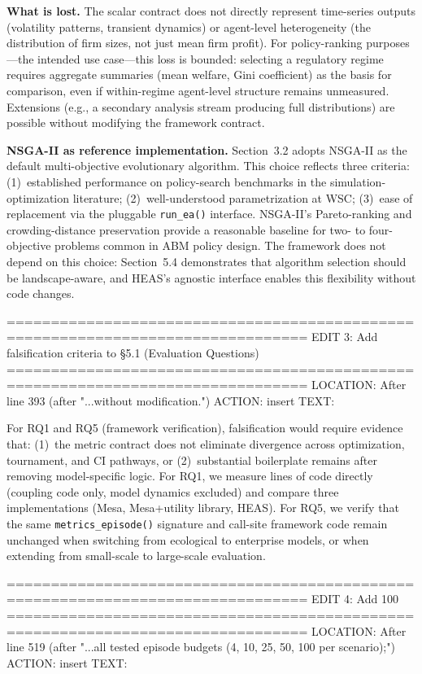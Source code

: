 \textbf{What is lost.} The scalar contract does not directly represent
time-series outputs (volatility patterns, transient dynamics) or agent-level
heterogeneity (the distribution of firm sizes, not just mean firm profit). For
policy-ranking purposes---the intended use case---this loss is bounded: selecting
a regulatory regime requires aggregate summaries (mean welfare, Gini coefficient)
as the basis for comparison, even if within-regime agent-level structure remains
unmeasured. Extensions (e.g., a secondary analysis stream producing full
distributions) are possible without modifying the framework contract.

\textbf{NSGA-II as reference implementation.} Section~3.2 adopts NSGA-II as the
default multi-objective evolutionary algorithm. This choice reflects three
criteria: (1)~established performance on policy-search benchmarks in the
simulation-optimization literature; (2)~well-understood parametrization at WSC;
(3)~ease of replacement via the pluggable \texttt{run\_ea()} interface. NSGA-II's
Pareto-ranking and crowding-distance preservation provide a reasonable baseline
for two- to four-objective problems common in ABM policy design. The framework
does not depend on this choice: Section~5.4 demonstrates that algorithm
selection should be landscape-aware, and HEAS's agnostic interface enables this
flexibility without code changes.

================================================================================
EDIT 3: Add falsification criteria to §5.1 (Evaluation Questions)
================================================================================
LOCATION: After line 393 (after "...without modification.")
ACTION: insert
TEXT:

For RQ1 and RQ5 (framework verification), falsification would require evidence
that: (1)~the metric contract does not eliminate divergence across optimization,
tournament, and CI pathways, or (2)~substantial boilerplate remains after
removing model-specific logic. For RQ1, we measure lines of code directly
(coupling code only, model dynamics excluded) and compare three implementations
(Mesa, Mesa+utility library, HEAS). For RQ5, we verify that the same
\texttt{metrics\_episode()} signature and call-site framework code remain
unchanged when switching from ecological to enterprise models, or when extending
from small-scale to large-scale evaluation.

================================================================================
EDIT 4: Add 100%
================================================================================
LOCATION: After line 519 (after "...all tested episode budgets (4, 10, 25, 50, 100 per scenario);")
ACTION: insert
TEXT:

